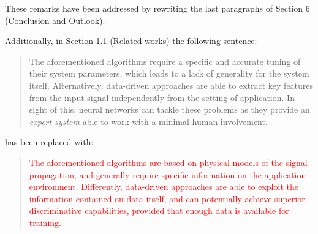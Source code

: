 \documentclass[11pt, technote, letterpaper, oneside, onecolumn]{IEEEtran}
\begin{document}
\begin{enumerate}
These remarks have been addressed by rewriting the last paragraphs of  Section 6 (Conclusion and Outlook).

Additionally, in Section 1.1 (Related works) the following sentence:
\begin{quote}
The aforementioned algorithms require a specific and accurate tuning of their system parameters, which leads to a lack of generality for the system itself. Alternatively, data-driven approaches are able to extract key features from the input signal independently from the setting of application. In sight of this, neural networks can tackle these problems as they provide an \textit{expert system} able to work with a minimal human involvement.
\end{quote}
has been replaced with:
\begin{quote}
\textcolor{red}{The aforementioned algorithms are based on physical models of the signal propagation, and generally require specific information on the application environment. Differently, data-driven approaches are able to exploit the information contained on data itself, and can potentially achieve superior discriminative capabilities, provided that enough data is available for training.}
\end{quote}

 
 

\end{enumerate}
\end{document}
